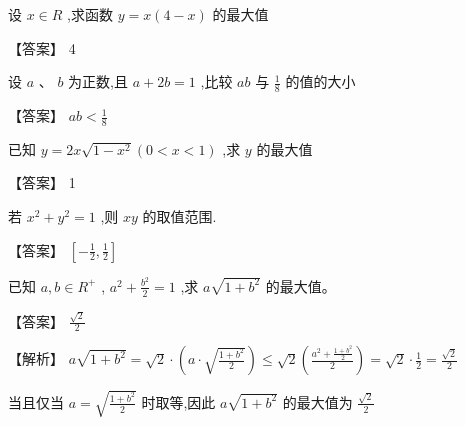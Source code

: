 \documentclass[11pt,a4paper]{article}
\begin{document}
\begin{problem} 


设 \(\displaystyle x \in  R\) ,求函数 \(\displaystyle y = x\left( {4 - x}\right)\) 的最大值
\begin{jiexi}[25]
【答案】 4


\end{jiexi}
\end{problem}
\begin{problem} 
设 \(\displaystyle a\) 、 \(\displaystyle b\) 为正数,且 \(\displaystyle a + {2b} = 1\) ,比较 \(\displaystyle {ab}\) 与 \(\displaystyle \frac{1}{8}\) 的值的大小
\begin{jiexi}[25]
【答案】 \(\displaystyle {ab} < \frac{1}{8}\)

\end{jiexi}
\end{problem}
\begin{problem} 


已知 \(\displaystyle y = {2x}\sqrt{1 - {x}^{2}}\left( {0 < x < 1}\right)\) ,求 \(\displaystyle y\) 的最大值
\begin{jiexi}[25]
【答案】 1


\end{jiexi}
\end{problem}
\begin{problem} 
若 \(\displaystyle {x}^{2} + {y}^{2} = 1\) ,则 \(\displaystyle {xy}\) 的取值范围.
\begin{jiexi}[25]
【答案】 \(\displaystyle \left\lbrack  {-\frac{1}{2},\frac{1}{2}}\right\rbrack\)


\end{jiexi}
\end{problem}
\begin{problem} 
已知 \(\displaystyle a,b \in  {R}^{ + }\) , \(\displaystyle {a}^{2} + \frac{{b}^{2}}{2} = 1\) ,求 \(\displaystyle a\sqrt{1 + {b}^{2}}\) 的最大值。
\begin{jiexi}[25]
【答案】 \(\displaystyle \frac{\sqrt{2}}{2}\)

【解析】 \(\displaystyle a\sqrt{1 + {b}^{2}} = \sqrt{2} \cdot  \left( {a \cdot  \sqrt{\frac{1 + {b}^{2}}{2}}}\right)  \leq  \sqrt{2}\left( \frac{{a}^{2} + \frac{1 + {b}^{2}}{2}}{2}\right)  = \sqrt{2} \cdot  \frac{1}{2} = \frac{\sqrt{2}}{2}\)

当且仅当 \(\displaystyle a = \sqrt{\frac{1 + {b}^{2}}{2}}\) 时取等,因此 \(\displaystyle a\sqrt{1 + {b}^{2}}\) 的最大值为 \(\displaystyle \frac{\sqrt{2}}{2}\) 

\end{jiexi}
\end{problem}
\end{document}
